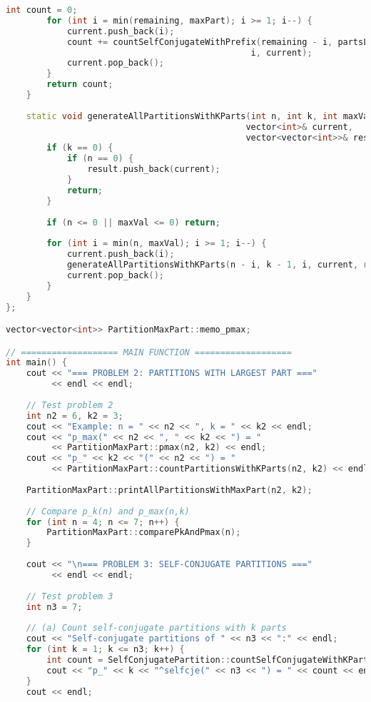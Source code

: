 \documentclass[12pt,a4paper]{article}
\theoremstyle{definition}
\begin{document}
\begin{lstlisting}[language=C++, caption=Chương trình C++ hoàn chỉnh cho bài 2 \& 3]
        int count = 0;
        for (int i = min(remaining, maxPart); i >= 1; i--) {
            current.push_back(i);
            count += countSelfConjugateWithPrefix(remaining - i, partsLeft - 1, 
                                                i, current);
            current.pop_back();
        }
        return count;
    }
    
    static void generateAllPartitionsWithKParts(int n, int k, int maxVal, 
                                               vector<int>& current, 
                                               vector<vector<int>>& result) {
        if (k == 0) {
            if (n == 0) {
                result.push_back(current);
            }
            return;
        }
        
        if (n <= 0 || maxVal <= 0) return;
        
        for (int i = min(n, maxVal); i >= 1; i--) {
            current.push_back(i);
            generateAllPartitionsWithKParts(n - i, k - 1, i, current, result);
            current.pop_back();
        }
    }
};

vector<vector<int>> PartitionMaxPart::memo_pmax;

// =================== MAIN FUNCTION ===================
int main() {
    cout << "=== PROBLEM 2: PARTITIONS WITH LARGEST PART ===" 
         << endl << endl;
    
    // Test problem 2
    int n2 = 6, k2 = 3;
    cout << "Example: n = " << n2 << ", k = " << k2 << endl;
    cout << "p_max(" << n2 << ", " << k2 << ") = " 
         << PartitionMaxPart::pmax(n2, k2) << endl;
    cout << "p_" << k2 << "(" << n2 << ") = " 
         << PartitionMaxPart::countPartitionsWithKParts(n2, k2) << endl << endl;
    
    PartitionMaxPart::printAllPartitionsWithMaxPart(n2, k2);
    
    // Compare p_k(n) and p_max(n,k)
    for (int n = 4; n <= 7; n++) {
        PartitionMaxPart::comparePkAndPmax(n);
    }
    
    cout << "\n=== PROBLEM 3: SELF-CONJUGATE PARTITIONS ===" 
         << endl << endl;
    
    // Test problem 3
    int n3 = 7;
    
    // (a) Count self-conjugate partitions with k parts
    cout << "Self-conjugate partitions of " << n3 << ":" << endl;
    for (int k = 1; k <= n3; k++) {
        int count = SelfConjugatePartition::countSelfConjugateWithKParts(n3, k);
        cout << "p_" << k << "^selfcje(" << n3 << ") = " << count << endl;
    }
    cout << endl;
    

\end{lstlisting}
\end{document}
